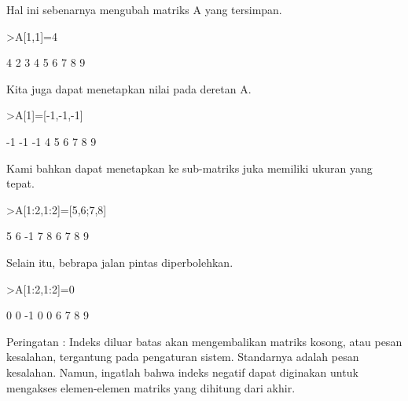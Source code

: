 \documentclass[a4paper,10pt]{article}
\begin{document}
\begin{eulernotebook}
\begin{eulercomment}
\begin{eulercomment}
\begin{eulercomment}
\begin{eulercomment}
\begin{eulercomment}
Hal ini sebenarnya mengubah matriks A yang tersimpan.
\end{eulercomment}
\begin{eulerprompt}
>A[1,1]=4
\end{eulerprompt}
\begin{euleroutput}
              4             2             3 
              4             5             6 
              7             8             9 
\end{euleroutput}
\begin{eulercomment}
Kita juga dapat menetapkan nilai pada deretan A.
\end{eulercomment}
\begin{eulerprompt}
>A[1]=[-1,-1,-1]
\end{eulerprompt}
\begin{euleroutput}
             -1            -1            -1 
              4             5             6 
              7             8             9 
\end{euleroutput}
\begin{eulercomment}
Kami bahkan dapat menetapkan ke sub-matriks juka memiliki ukuran yang
tepat.
\end{eulercomment}
\begin{eulerprompt}
>A[1:2,1:2]=[5,6;7,8]
\end{eulerprompt}
\begin{euleroutput}
              5             6            -1 
              7             8             6 
              7             8             9 
\end{euleroutput}
\begin{eulercomment}
Selain itu, bebrapa jalan pintas diperbolehkan.
\end{eulercomment}
\begin{eulerprompt}
>A[1:2,1:2]=0
\end{eulerprompt}
\begin{euleroutput}
              0             0            -1 
              0             0             6 
              7             8             9 
\end{euleroutput}
\begin{eulercomment}
Peringatan : Indeks diluar batas akan mengembalikan matriks kosong,
atau pesan kesalahan, tergantung pada pengaturan sistem. Standarnya
adalah pesan kesalahan. Namun, ingatlah bahwa indeks negatif dapat
diginakan untuk mengakses elemen-elemen matriks yang dihitung dari
akhir.
\end{eulercomment}
\begin{eulerprompt}

\end{eulerprompt}
\end{eulercomment}
\end{eulercomment}
\end{eulercomment}
\end{eulercomment}
\end{eulernotebook}
\end{document}
